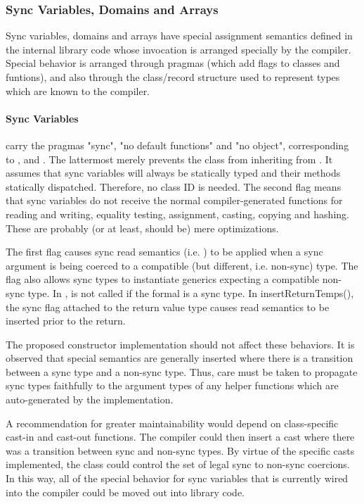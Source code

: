 \subsubsection{Sync Variables, Domains and Arrays} 

Sync variables, domains and arrays have special assignment semantics defined
in the internal library code whose invocation is arranged specially by the
compiler.  Special behavior is arranged through pragmas (which add flags to classes and
funtions), and also through the class/record structure used to represent types
which are known to the compiler.  

\paragraph{Sync Variables} carry the pragmas "sync", "no default functions" and "no object",
corresponding to ,  and .  The
lattermost merely prevents the  class from inheriting from .  It
assumes that sync variables will always be statically typed and their methods
statically dispatched.  Therefore, no class ID is needed.  The second flag means
that sync variables do not receive the normal compiler-generated functions for
reading and writing, equality testing, assignment, casting, copying and
hashing.  These are probably (or at least, should be) mere optimizations.

The first flag causes sync read semantics (i.e. ) to be applied
when a sync argument is being coerced to a compatible (but different,
i.e. non-sync) type.  The flag also allows sync types to instantiate generics
expecting a compatible non-sync type.  In ,  is
not called if the formal is a sync type.  In insertReturnTemps(), the sync flag
attached to the return value type causes read semantics to be inserted prior to
the return.

The proposed constructor implementation should not affect these behaviors.  It is
observed that special semantics are generally inserted where there is a
transition between a sync type and a non-sync type.  Thus, care must be taken to
propagate sync types faithfully to the argument types of any helper functions
which are auto-generated by the implementation.  

A recommendation for greater maintainability would depend on class-specific
cast-in and cast-out functions.  The compiler could then insert a cast where
there was a transition between sync and non-sync types.  By virtue of the
specific casts implemented, the class could control the set of legal sync to
non-sync coercions.  In this way, all of the special behavior for sync variables
that is currently wired into the compiler could be moved out into library code.

